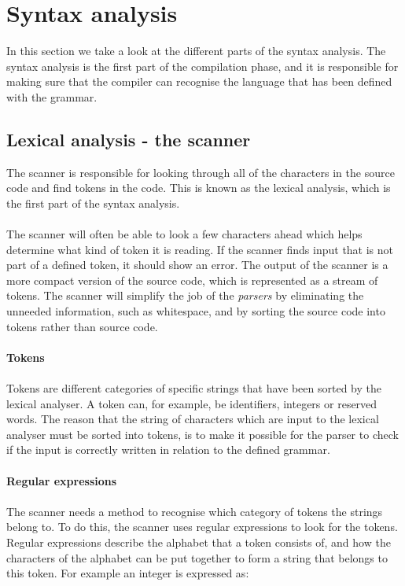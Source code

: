 \section{Syntax analysis}
In this section we take a look at the different parts of the syntax analysis. The syntax analysis is the first part of the compilation phase, and it is responsible for making sure that the compiler can recognise the language that has been defined with the grammar. 
\subsection{Lexical analysis - the scanner}
The scanner is responsible for looking through all of the characters in the source code and find tokens in the code. This is known as the lexical analysis, which is the first part of the syntax analysis. 
\\\\
The scanner will often be able to look a few characters ahead which helps determine what kind of token it is reading. If the scanner finds input that is not part of a defined token, it should show an error. The output of the scanner is a more compact version of the source code, which is represented as a stream of tokens. The scanner will simplify the job of the \textit{parsers} by eliminating the unneeded information, such as whitespace, and by sorting the source code into tokens \cite{CraftinfACompiler} rather than source code.
\\\\
\textbf{Tokens}
\\\\
Tokens are different categories of specific strings that have been sorted by the lexical analyser. A token can, for example, be identifiers, integers or reserved words. The reason that the string of characters which are input to the lexical analyser must be sorted into tokens, is to make it possible for the parser to check if the input is correctly written in relation to the defined grammar.
\\\\
\textbf{Regular expressions}
\\\\
The scanner needs a method to recognise which category of tokens the strings belong to. To do this, the scanner uses regular expressions to look for the tokens. Regular expressions describe the alphabet that a token consists of, and how the characters of the alphabet can be put together to form a string that belongs to this token. For example an integer is expressed as:
